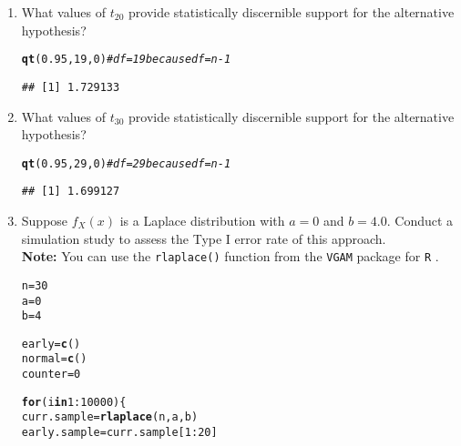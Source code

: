 \documentclass{article}\usepackage[]{graphicx}\usepackage[]{xcolor}
\makeatletter
\newcommand{\hlnum}[1]{\textcolor[rgb]{0.686,0.059,0.569}{#1}}%
\newcommand{\hlcom}[1]{\textcolor[rgb]{0.678,0.584,0.686}{\textit{#1}}}%
\newcommand{\hlopt}[1]{\textcolor[rgb]{0,0,0}{#1}}%
\newcommand{\hldef}[1]{\textcolor[rgb]{0.345,0.345,0.345}{#1}}%
\newcommand{\hlkwa}[1]{\textcolor[rgb]{0.161,0.373,0.58}{\textbf{#1}}}%
\newcommand{\hlkwb}[1]{\textcolor[rgb]{0.69,0.353,0.396}{#1}}%
\newcommand{\hlkwd}[1]{\textcolor[rgb]{0.737,0.353,0.396}{\textbf{#1}}}%
\newenvironment{kframe}{%
 \def\at@end@of@kframe{}%
 \ifinner\ifhmode%
  \def\at@end@of@kframe{\end{minipage}}%
  \begin{minipage}{\columnwidth}%
 \fi\fi%
 \def\FrameCommand##1{\hskip\@totalleftmargin \hskip-\fboxsep
 \colorbox{shadecolor}{##1}\hskip-\fboxsep
     \hskip-\linewidth \hskip-\@totalleftmargin \hskip\columnwidth}%
 \MakeFramed {\advance\hsize-\width
   \@totalleftmargin\z@ \linewidth\hsize
   \@setminipage}}%
 {\par\unskip\endMakeFramed%
 \at@end@of@kframe}
\newenvironment{knitrout}{}{} %
\makeatother
\begin{document}
\begin{enumerate}
\begin{enumerate}
  \item What values of $t_{20}$ provide statistically discernible support for the
  alternative hypothesis?
\begin{knitrout}\scriptsize
{}\color{fgcolor}\begin{kframe}
\begin{alltt}
\hlkwd{qt}\hldef{(}\hlnum{0.95}\hldef{,}\hlnum{19}\hldef{,}\hlnum{0}\hldef{)} \hlcom{#df = 19 because df = n-1}
\end{alltt}
\begin{verbatim}
## [1] 1.729133
\end{verbatim}
\end{kframe}
\end{knitrout}
  \item What values of $t_{30}$ provide statistically discernible support for the
  alternative hypothesis?
\begin{knitrout}\scriptsize
{}\color{fgcolor}\begin{kframe}
\begin{alltt}
\hlkwd{qt}\hldef{(}\hlnum{0.95}\hldef{,}\hlnum{29}\hldef{,}\hlnum{0}\hldef{)} \hlcom{#df = 29 because df = n-1}
\end{alltt}
\begin{verbatim}
## [1] 1.699127
\end{verbatim}
\end{kframe}
\end{knitrout}
  \item Suppose $f_X(x)$ is a Laplace distribution with $a=0$ and $b=4.0$.
  Conduct a simulation study to assess the Type I error rate of this approach.\\
  \textbf{Note:} You can use the \texttt{rlaplace()} function from the \texttt{VGAM}
  package for \texttt{R} \citep{VGAM}.
\begin{knitrout}\scriptsize
{}\color{fgcolor}\begin{kframe}
\begin{alltt}
\hldef{n} \hlkwb{=} \hlnum{30}
\hldef{a} \hlkwb{=} \hlnum{0}
\hldef{b} \hlkwb{=} \hlnum{4}

\hldef{early} \hlkwb{=} \hlkwd{c}\hldef{()}
\hldef{normal} \hlkwb{=} \hlkwd{c}\hldef{()}
\hldef{counter} \hlkwb{=} \hlnum{0}


\hlkwa{for}\hldef{(i} \hlkwa{in} \hlnum{1}\hlopt{:}\hlnum{10000}\hldef{)\{}
\hldef{curr.sample} \hlkwb{=} \hlkwd{rlaplace}\hldef{(n,a,b)}
\hldef{early.sample} \hlkwb{=} \hldef{curr.sample[}\hlnum{1}\hlopt{:}\hlnum{20}\hldef{]}


\end{alltt}
\end{kframe}
\end{knitrout}
\end{enumerate}
\end{enumerate}
\end{document}
